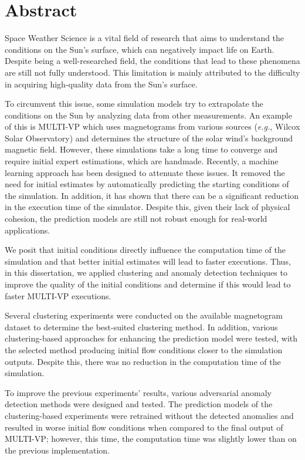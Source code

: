 \chapter*{Abstract}
Space Weather Science is a vital field of research that aims to understand the conditions on the Sun's surface, which can negatively impact life on Earth. Despite being a well-researched field, the conditions that lead to these phenomena are still not fully understood. This limitation is mainly attributed to the difficulty in acquiring high-quality data from the Sun's surface.

To circumvent this issue, some simulation models try to extrapolate the conditions on the Sun by analyzing data from other measurements. An example of this is MULTI-VP which uses magnetograms from various sources (\textit{e.g.}, Wilcox Solar Observatory) and determines the structure of the solar wind's background magnetic field. However, these simulations take a long time to converge and require initial expert estimations, which are handmade. Recently, a machine learning approach has been designed to attenuate these issues. It removed the need for initial estimates by automatically predicting the starting conditions of the simulation. In addition, it has shown that there can be a significant reduction in the execution time of the simulator. Despite this, given their lack of physical cohesion, the prediction models are still not robust enough for real-world applications. 

We posit that initial conditions directly influence the computation time of the simulation and that better initial estimates will lead to faster executions. Thus, in this dissertation, we applied clustering and anomaly detection techniques to improve the quality of the initial conditions and determine if this would lead to faster MULTI-VP executions.

Several clustering experiments were conducted on the available magnetogram dataset to determine the best-suited clustering method. In addition, various clustering-based approaches for enhancing the prediction model were tested, with the selected method producing initial flow conditions closer to the simulation outputs. Despite this, there was no reduction in the computation time of the simulation.

To improve the previous experiments' results, various adversarial anomaly detection methods were designed and tested. The prediction models of the clustering-based experiments were retrained without the detected anomalies and resulted in worse initial flow conditions when compared to the final output of MULTI-VP; however, this time, the computation time was slightly lower than on the previous implementation.


